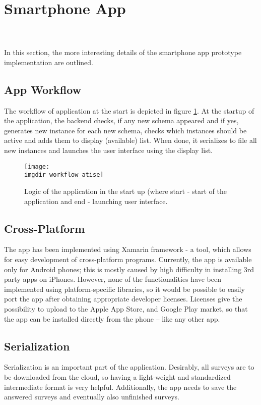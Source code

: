 \section{Smartphone App}
\label{sec:app}
\anna \\\\
In this section, the more interesting details of the smartphone app prototype implementation are outlined.

\subsection{App Workflow}
\label{subsec:workflow}
The workflow of application at the start is depicted in figure \ref{fig:startup-workflow}. At the startup of the application, the backend checks, if any new schema appeared and if yes, generates new instance for each new schema, checks which instances should be active and adds them to display (available) list. When done, it serializes to file all new instances and launches the user interface using the display list. 

\begin{figure}[!htbp]
  \centering
    \centering
    \texttt{[image: \\imgdir workflow\_atise]}
    \caption{Logic of the application in the start up (where start - start of the application and end - launching user interface.}
    \label{fig:startup-workflow}
\end{figure}

\subsection{Cross-Platform}
\label{subsec:crossplatform}
The app has been implemented using Xamarin framework - a tool, which allows for easy development of cross-platform programs. Currently, the app is available only for Android phones; this is mostly caused by high difficulty in installing 3rd party apps on iPhones. However, none of the functionalities have been implemented using platform-specific libraries, so it would be possible to easily port the app after obtaining appropriate developer licenses. Licenses give the possibility to upload to the Apple App Store, and Google Play market, so that the app can be installed directly from the phone -- like any other app.

\subsection{Serialization}
\label{subsec:serialization}
Serialization is an important part of the application. Desirably, all surveys are to be downloaded from the cloud, so having a light-weight and standardized intermediate format is very helpful. Additionally, the app needs to save the answered surveys and eventually also unfinished surveys.

